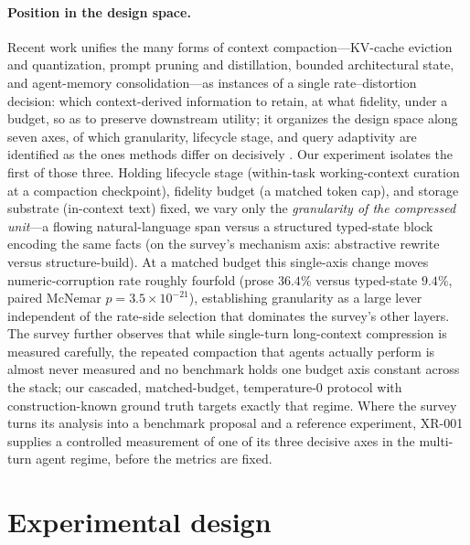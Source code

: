 \documentclass[11pt]{article}
\begin{document}
\paragraph{Position in the design space.}
Recent work unifies the many forms of context compaction---KV-cache eviction
and quantization, prompt pruning and distillation, bounded architectural
state, and agent-memory consolidation---as instances of a single
rate--distortion decision: which context-derived information to retain, at
what fidelity, under a budget, so as to preserve downstream utility; it
organizes the design space along seven axes, of which granularity, lifecycle
stage, and query adaptivity are identified as the ones methods differ on
decisively \citep{colaco2026ratedistortion}. Our experiment isolates the
first of those three. Holding lifecycle stage (within-task working-context
curation at a compaction checkpoint), fidelity budget (a matched token cap),
and storage substrate (in-context text) fixed, we vary only the
\emph{granularity of the compressed unit}---a flowing natural-language span
versus a structured typed-state block encoding the same facts (on the
survey's mechanism axis: abstractive rewrite versus structure-build). At a
matched budget this single-axis change moves numeric-corruption rate roughly
fourfold (prose $36.4\%$ versus typed-state $9.4\%$, paired McNemar
$p = 3.5\times10^{-21}$), establishing granularity as a large lever
independent of the rate-side selection that dominates the survey's other
layers. The survey further observes that while single-turn long-context
compression is measured carefully, the repeated compaction that agents
actually perform is almost never measured and no benchmark holds one budget
axis constant across the stack; our cascaded, matched-budget, temperature-0
protocol with construction-known ground truth targets exactly that regime.
Where the survey turns its analysis into a benchmark proposal and a reference
experiment, XR-001 supplies a controlled measurement of one of its three
decisive axes in the multi-turn agent regime, before the metrics are fixed.

\section{Experimental design}
\label{sec:design}
\end{document}
